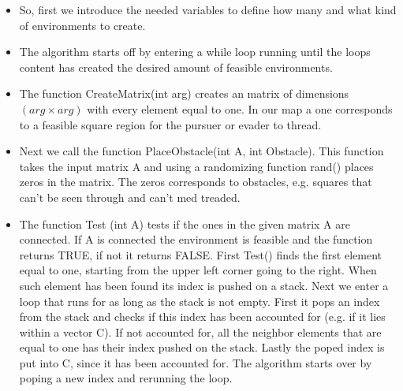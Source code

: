 \begin{itemize}
\item So, first we introduce the needed variables to define how many and what kind of environments to create. 
\item The algorithm starts off by entering a while loop running until the loops content has created the desired amount of feasible environments. 
\item The function CreateMatrix(int arg) creates an matrix of dimensions $(arg \times arg)$ with every element equal to one. In our map a one corresponds to a feasible square region for the pursuer or evader to thread. 
\item Next we call the function PlaceObstacle(int A, int Obstacle). This function takes the input matrix A and using a randomizing function rand() places zeros in the matrix. The zeros corresponds to obstacles, e.g. squares that can't be seen through and can't med treaded.
\item The function Test (int A) tests if the ones in the given matrix A are connected. If A is connected the environment is feasible and the function returns TRUE, if not it returns FALSE. First Test() finds the first element equal to one, starting from the upper left corner going to the right. When such element has been found its index is pushed on a stack. Next we enter a loop that runs for as long as the stack is not empty. First it pops an index from the stack and checks if this index has been accounted for (e.g. if it lies within a vector C). If not accounted for, all the neighbor elements that are equal to one has their index pushed on the stack. Lastly the poped index is put into C, since it has been accounted for. The algorithm starts over by poping a new index and rerunning the loop. 
\end{itemize}

